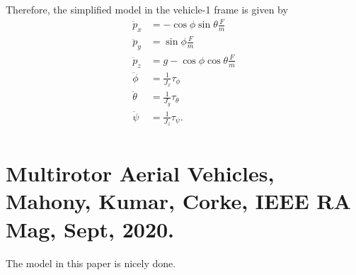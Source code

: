 {Therefore, the simplified model in the vehicle-1 frame is given by
\begin{align}
\ddot{p}_x    &= -\cos\phi \sin\theta \frac{F}{m}
\label{eq:quadrotor-simple-px} \\
\ddot{p}_y    &= \sin\phi \frac{F}{m}
\label{eq:quadrotor-simple-py} \\
\ddot{p}_z    &= g - \cos\phi \cos\theta \frac{F}{m}
\label{eq:quadrotor-simple-pz} \\
\ddot{\phi}   &= \frac{1}{J_x} \tau_{\phi}
\label{eq:quadrotor-simple-phi2} \\
\ddot{\theta} &= \frac{1}{J_y} \tau_{\theta}
\label{eq:quadrotor-simple-theta2} \\
\ddot{\psi}   &= \frac{1}{J_z} \tau_{\psi}.
\label{eq:quadrotor-simple-psi2} \\
\end{align}

} 

\section{Multirotor Aerial Vehicles, Mahony, Kumar, Corke, IEEE RA Mag, Sept, 2020.}
The model in this paper is nicely done.






